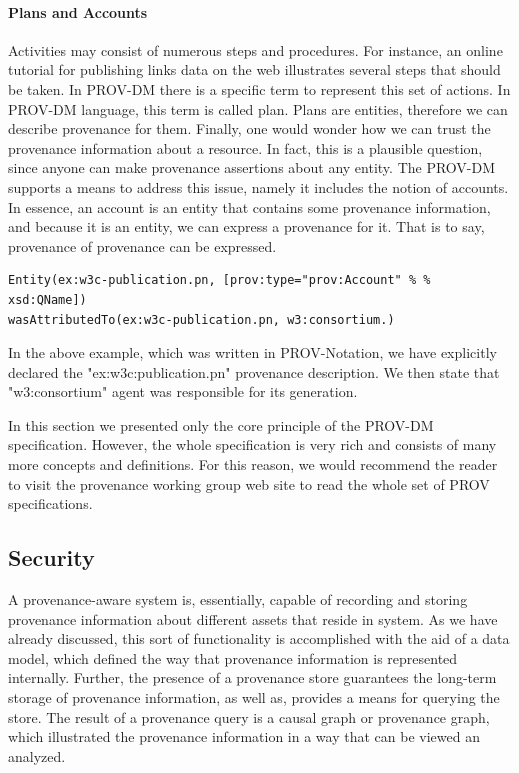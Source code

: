 \paragraph{Plans and Accounts}

Activities may consist of numerous steps and procedures. For instance, an online tutorial for publishing links data on the web illustrates several steps that should be taken. In PROV-DM there is a specific term to represent this set of actions. In PROV-DM language, this term is called plan. Plans are entities, therefore we can describe provenance for them.
Finally, one would wonder how we can trust the provenance information about a resource. In fact, this is a plausible question, since anyone can make provenance assertions about any entity. The PROV-DM supports a means to address this issue, namely it includes the notion of accounts. In essence, an account is an entity that contains some provenance information, and because it is an entity, we can express a provenance for it. That is to say, provenance of provenance can be expressed.

\begin{verbatim}
Entity(ex:w3c-publication.pn, [prov:type="prov:Account" % % xsd:QName])
wasAttributedTo(ex:w3c-publication.pn, w3:consortium.)
\end{verbatim}

In the above example, which was written in PROV-Notation, we have explicitly declared the "ex:w3c:publication.pn" provenance description. We then state that "w3:consortium" agent was responsible for its generation.

In this section we presented only the core principle of the PROV-DM specification. However, the whole specification is very rich and consists of many more concepts and definitions. For this reason, we would recommend the reader to visit the provenance working group web site to read the whole set of PROV specifications.

\subsection{Security}

A provenance-aware system is, essentially, capable of recording and storing provenance information about different assets that reside in system. As we have already discussed, this sort of functionality is accomplished with the aid of a data model, which defined the way that provenance information is represented internally. Further, the presence of a provenance store guarantees the long-term storage of provenance information, as well as, provides a means for querying the store\cite{reference19:5}. The result of a provenance query is a causal graph or provenance graph, which illustrated the provenance information in a way that can be viewed an analyzed.

